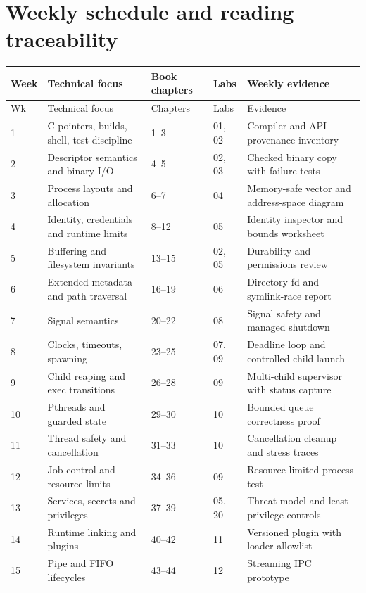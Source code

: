 \documentclass[11pt,letterpaper,oneside]{report}
\begin{document}
\chapter{Weekly schedule and reading traceability}
\footnotesize\setlength{\tabcolsep}{3pt}\begin{longtable}{p{.065\linewidth}p{.245\linewidth}p{.115\linewidth}p{.12\linewidth}p{.35\linewidth}}\toprule
Week & Technical focus & Book chapters & Labs & Weekly evidence\\\midrule\endfirsthead
\toprule Wk & Technical focus & Chapters & Labs & Evidence\\\midrule\endhead
1 & C pointers, builds, shell, test discipline & 1--3 & 01, 02 & Compiler and API provenance inventory\\
2 & Descriptor semantics and binary I/O & 4--5 & 02, 03 & Checked binary copy with failure tests\\
3 & Process layouts and allocation & 6--7 & 04 & Memory-safe vector and address-space diagram\\
4 & Identity, credentials and runtime limits & 8--12 & 05 & Identity inspector and bounds worksheet\\
5 & Buffering and filesystem invariants & 13--15 & 02, 05 & Durability and permissions review\\
6 & Extended metadata and path traversal & 16--19 & 06 & Directory-fd and symlink-race report\\
7 & Signal semantics & 20--22 & 08 & Signal safety and managed shutdown\\
8 & Clocks, timeouts, spawning & 23--25 & 07, 09 & Deadline loop and controlled child launch\\
9 & Child reaping and exec transitions & 26--28 & 09 & Multi-child supervisor with status capture\\
10 & Pthreads and guarded state & 29--30 & 10 & Bounded queue correctness proof\\
11 & Thread safety and cancellation & 31--33 & 10 & Cancellation cleanup and stress traces\\
12 & Job control and resource limits & 34--36 & 09 & Resource-limited process test\\
13 & Services, secrets and privileges & 37--39 & 05, 20 & Threat model and least-privilege controls\\
14 & Runtime linking and plugins & 40--42 & 11 & Versioned plugin with loader allowlist\\
15 & Pipe and FIFO lifecycles & 43--44 & 12 & Streaming IPC prototype\\

\end{longtable}
\end{document}
